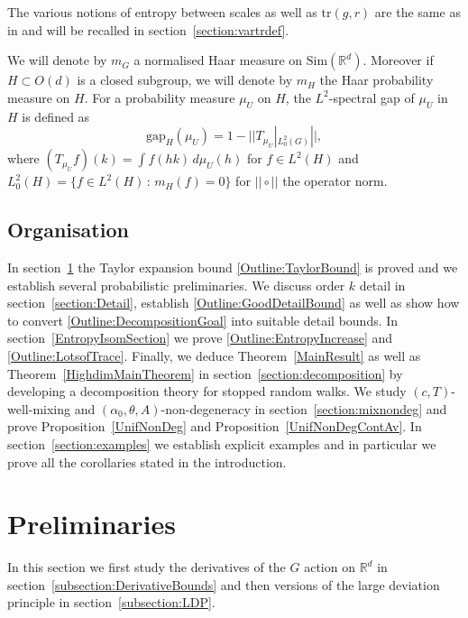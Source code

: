\documentclass[10pt, english,oneside,reqno]{amsart}
\theoremstyle{plain}
\theoremstyle{remark}
\numberwithin{equation}{section}
\numberwithin{figure}{section}
\newcommand{\tr}{\mathrm{tr}}
\newcommand{\R}{\mathbb{R}}
\newcommand{\Haarof}[1]{m_{#1}}
\begin{document}
The various notions of entropy between scales as well as $\tr(g,r)$ are the same as in \cite{KittleKoglerEntropy} and will be recalled in section~\ref{section:vartrdef}. 

We will denote by $\Haarof{G}$ a normalised Haar measure on $\mathrm{Sim}(\R^d)$. Moreover if $H\subset O(d)$ is a closed subgroup, we will denote by $\Haarof{H}$ the Haar probability measure on $H$. For a probability measure $\mu_U$ on $H$, the $L^2$-spectral gap of $\mu_U$ in $H$ is defined as 
\begin{equation}\label{SpectralGapDef}
    \mathrm{gap}_H(\mu_U) = 1 - ||T_{\mu_U}|_{L^2_0(G)}||,
\end{equation}
where $(T_{\mu_U}f)(k) = \int f(hk) \, d\mu_U(h)$ for $f \in L^2(H)$ and $L^2_0(H) = \{ f \in L^2(H) \,:\, \Haarof{H}(f) = 0\}$ for $||\circ||$ the operator norm.



\subsection{Organisation} \label{section:organisation} 

In section~\ref{section:prelim} the Taylor expansion bound \eqref{Outline:TaylorBound} is proved and we establish several probabilistic preliminaries. We discuss order $k$ detail in section~\ref{section:Detail}, establish  \eqref{Outline:GoodDetailBound} as well as show how to convert \eqref{Outline:DecompositionGoal} into suitable detail bounds. In section~\ref{EntropyIsomSection} we prove \eqref{Outline:EntropyIncrease} and \eqref{Outline:LotsofTrace}. Finally, we deduce Theorem~\ref{MainResult} as well as Theorem~\ref{HighdimMainTheorem} in section~\ref{section:decomposition} by developing a decomposition theory for stopped random walks. We study $(c,T)$-well-mixing and $(\alpha_0,\theta,A)$-non-degeneracy in section~\ref{section:mixnondeg} and prove Proposition~\ref{UnifNonDeg} and Proposition~\ref{UnifNonDegContAv}. In section~\ref{section:examples} we establish explicit examples and in particular we prove all the corollaries stated in the introduction.

    \section{Preliminaries}

    \label{section:prelim}


In this section we first study the derivatives of the $G$ action on $\R^d$ in section~\ref{subsection:DerivativeBounds} and then versions of the large deviation principle in section~\ref{subsection:LDP}.
\end{document}
